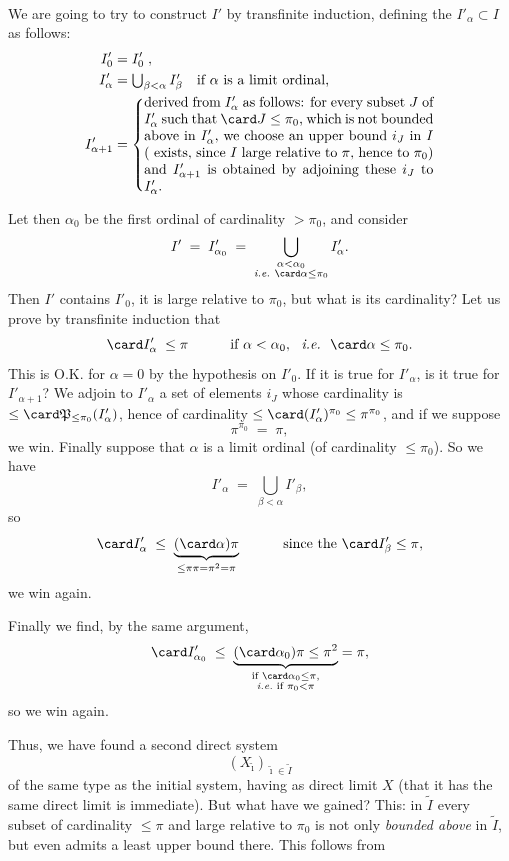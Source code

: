 \

We are going to try to construct $I'$ by transfinite induction, defining the $I'_\alpha\subset I$ as follows:
\[
\begin{aligned}
I'_0 &= I'_0\;, \\
I'_\alpha &= \textstyle\bigcup_{\beta<\alpha} I'_\beta \quad \text{if $\alpha$ is a limit ordinal,} \\
I'_{\alpha+1} &= \left\{\parbox{0.6\textwidth}{derived from $I'_\alpha$ as follows: for every subset $J$ of $I'_\alpha$ such that $\card J\le\pi_0$, which is not bounded above in $I'_\alpha$, we choose an upper bound $i_J$ in $I$ ( exists, since $I$ large relative to $\pi$, hence to $\pi_0$) and $I'_{\alpha+1}$ is obtained by adjoining these $i_J$ to $I'_\alpha$.}\right.
\end{aligned}
\]

Let then $\alpha_0$ be the first ordinal of cardinality $>\pi_0$, and consider
\[
I' \;=\; I'_{\alpha_0} \;=\; \bigcup\limits_{\substack{\alpha<\alpha_0\\ \textit{i.e.}\ \card\alpha\le\pi_0}} I'_\alpha .
\]
Then $I'$ contains $I'_0$, it is large relative to $\pi_0$, but what is its cardinality? Let us prove by transfinite induction that
\[
\card I'_\alpha \;\le\pi \qquad\quad \text{if } \alpha<\alpha_0,\ \ \textit{i.e.}\ \ \card\alpha\le\pi_0 .
\]
This is O.K. for $\alpha=0$ by the hypothesis on $I'_0$. If it is true for $I'_\alpha$, is it true for $I'_{\alpha+1}$? We adjoin to $I'_\alpha$ a set of elements $i_J$ whose cardinality is $\le\card\mathfrak{P}_{\le\pi_0}(I'_\alpha)$, hence of cardinality $\le\card(I'_\alpha)^{\pi_0}\le\pi^{\pi_0}$, and if we suppose
\[
\pi^{\pi_0} \;=\; \pi,
\]
we win. Finally suppose that $\alpha$ is a limit ordinal (of cardinality $\le\pi_0$). So we have
\[
I'_\alpha \;=\; \bigcup_{\beta<\alpha} I'_\beta ,
\]
so
\[
\card I'_\alpha \;\le\; \underbrace{(\card\alpha)\pi}_{\le\pi\pi=\pi^2=\pi} \qquad\quad \text{since the } \card I'_\beta\le\pi,
\]
we win again.

Finally we find, by the same argument,
\[
\card I'_{\alpha_0} \;\le\; \underbrace{(\card\alpha_0)\pi\le\pi^2}_{\substack{\text{if }\card\alpha_0\le\pi,\\ \textit{i.e.}\text{ if }\pi_0<\pi}} = \pi,
\]
so we win again.

Thus, we have found a second direct system
\[
(X_{\tilde\imath})_{\tilde\imath\in\tilde I}
\]
of the same type as the initial system, having as direct limit $X$ (that it has the same direct limit is immediate). But what have we gained? This: in $\tilde I$ every subset of cardinality $\le\pi$ and large relative to $\pi_0$ is not only \textit{bounded above} in $\tilde I$, but even admits a least upper bound there. This follows from %

